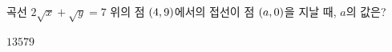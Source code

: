 곡선 $2\sqrt{x}+\sqrt{y}=7$ 위의 점 $(4{,}\mkern3mu\mathopen{}9)$에서의 접선이 점 $(a{,}\mkern3mu\mathopen{}0)$을 지날 때, $a$의 값은?
\begin{choices32}{$1$}{$3$}{$5$}{$7$}{$9$}\end{choices32}
